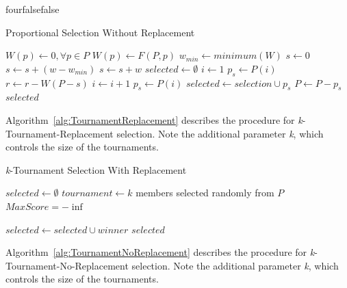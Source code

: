 \documentclass[times,12pt,titlepage]{mstogs}
\begin{document}
\begin{ThesisAppendix}{four}{false}{false}
\begin{algorithm}
\caption{Proportional Selection Without Replacement}
\label{alg:ProportionalNoReplacement}
\begin{algorithmic}[1]
 \label{proc:ProportionalNoReplacement}
	\State $W(p) \leftarrow 0,\forall p \in P$
		\State $W(p) \leftarrow F(P,p)$
	\EndFor
	\State $w_{min} \leftarrow minimum(W)$	
	\State $s \leftarrow 0$
			\State $s \leftarrow s + (w - w_{min} )$			
		\Else
			\State $s \leftarrow s + w$		
		\EndIf	
	\EndFor
	\State $selected \leftarrow \emptyset$
		\State $i \leftarrow 1$
		\State $p_s \leftarrow P(i)$
			\State $r \leftarrow r - W(P-s)$
			\State $i \leftarrow i + 1$
			\State $p_s \leftarrow P(i)$
		\EndWhile	
		\State $selected \leftarrow selection \cup p_s$
		\State $P \leftarrow P - p_s$
	\EndFor
	\State \Return $selected$
\EndFunction
\end{algorithmic}
\end{algorithm}

Algorithm~\ref{alg:TournamentReplacement} describes the procedure for \textit{k}-Tournament-Replacement selection. Note the additional parameter \textit{k}, which controls the size of the tournaments.

\begin{algorithm}
\caption{\textit{k}-Tournament Selection With Replacement}
\label{alg:TournamentReplacement}
\begin{algorithmic}[1]
 \label{proc:TournamentReplacement}
	\State $selected \leftarrow \emptyset$
		\State $tournament \leftarrow k$ members selected randomly from $P$
		\State $MaxScore = -\inf$

			\EndIf			
		\EndFor
		\State $selected \leftarrow selected \cup winner$
	\EndFor
	\State \Return $selected$
\EndFunction
\end{algorithmic}
\end{algorithm}

Algorithm~\ref{alg:TournamentNoReplacement} describes the procedure for \textit{k}-Tournament-No-Replacement selection. Note the additional parameter \textit{k}, which controls the size of the tournaments.


\end{ThesisAppendix}
\end{document}
